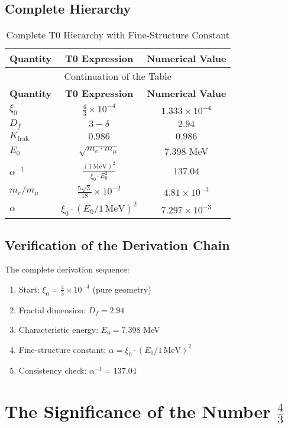 \documentclass[12pt,a4paper]{article}
\newcommand{\xipar}{\xi_0}
\newcommand{\Kfrak}{K_{\text{frak}}}
\newcommand{\Ezero}{E_0}
\newcommand{\Dfrak}{D_f}
\begin{document}
	\subsection{Complete Hierarchy}
	
	\begin{longtable}{lcc}
		\caption{Complete T0 Hierarchy with Fine-Structure Constant} \\
		\toprule
		\textbf{Quantity} & \textbf{T0 Expression} & \textbf{Numerical Value} \\
		\midrule
		\endfirsthead
		\multicolumn{3}{c}{Continuation of the Table} \\
		\toprule
		\textbf{Quantity} & \textbf{T0 Expression} & \textbf{Numerical Value} \\
		\midrule
		\endhead
		\bottomrule
		\endlastfoot
		$\xipar$ & $\frac{4}{3} \times 10^{-4}$ & $1.333 \times 10^{-4}$ \\
		$\Dfrak$ & $3 - \delta$ & $2.94$ \\
		$\Kfrak$ & $0.986$ & $0.986$ \\
		$\Ezero$ & $\sqrt{m_e \cdot m_\mu}$ & $7.398$ MeV \\
		$\alpha^{-1}$ & $\frac{(1\,\text{MeV})^2}{\xipar \cdot \Ezero^2}$ & $137.04$ \\
		$m_e/m_\mu$ & $\frac{5\sqrt{3}}{18} \times 10^{-2}$ & $4.81 \times 10^{-3}$ \\
		$\alpha$ & $\xipar \cdot (\Ezero/1\,\text{MeV})^2$ & $7.297 \times 10^{-3}$ \\
	\end{longtable}
	
	\subsection{Verification of the Derivation Chain}
	
	The complete derivation sequence:
	\begin{enumerate}
		\item Start: $\xipar = \frac{4}{3} \times 10^{-4}$ (pure geometry)
		\item Fractal dimension: $\Dfrak = 2.94$
		\item Characteristic energy: $\Ezero = 7.398$ MeV
		\item Fine-structure constant: $\alpha = \xipar \cdot (\Ezero/1\,\text{MeV})^2$
		\item Consistency check: $\alpha^{-1} = 137.04$ \checkmark
	\end{enumerate}
	
	\section{The Significance of the Number $\frac{4}{3}$}
	
\end{document}
